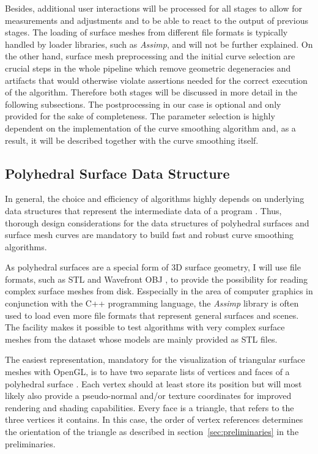 \documentclass{stdlocal}
\begin{document}
  Besides, additional user interactions will be processed for all stages to allow for measurements and adjustments and to be able to react to the output of previous stages.
  The loading of surface meshes from different file formats is typically handled by loader libraries, such as \textit{Assimp}, and will not be further explained.
  On the other hand, surface mesh preprocessing and the initial curve selection are crucial steps in the whole pipeline which remove geometric degeneracies and artifacts that would otherwise violate assertions needed for the correct execution of the algorithm.
  Therefore both stages will be discussed in more detail in the following subsections.
  The postprocessing in our case is optional and only provided for the sake of completeness.
  The parameter selection is highly dependent on the implementation of the curve smoothing algorithm and, as a result, it will be described together with the curve smoothing itself.

\subsection{Polyhedral Surface Data Structure} %
\label{sub:polyhedral_surface_data_structure}

  In general, the choice and efficiency of algorithms highly depends on underlying data structures that represent the intermediate data of a program \autocite{knuth1997,mehlhorn2008,smed2006}.
  Thus, thorough design considerations for the data structures of polyhedral surfaces and surface mesh curves are mandatory to build fast and robust curve smoothing algorithms.

  As polyhedral surfaces are a special form of 3D surface geometry, I will use file formats, such as STL \autocite{stl-file-format} and Wavefront OBJ \autocite{obj-file-format}, to provide the possibility for reading complex surface meshes from disk.
  Esspecially in the area of computer graphics in conjunction with the C++ programming language, the \textit{Assimp} library \autocite{assimp} is often used to load even more file formats that represent general surfaces and scenes.
  The facility makes it possible to test algorithms with very complex surface meshes from the  dataset whose models are mainly provided as STL files.

  The easiest representation, mandatory for the visualization of triangular surface meshes with OpenGL, is to have two separate lists of vertices and faces of a polyhedral surface \autocite{opengl}.
  Each vertex should at least store its position but will most likely also provide  a pseudo-normal and/or texture coordinates for improved rendering and shading capabilities.
  Every face is a triangle, that refers to the three vertices it contains.
  In this case, the order of vertex references determines the orientation of the triangle as described in section~\ref{sec:preliminaries} in the preliminaries.
\end{document}
